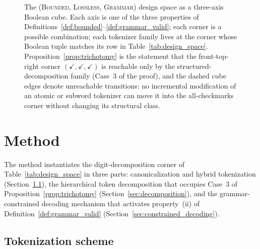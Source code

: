 \documentclass[sensors,article,submit,moreauthors,pdftex]{Definitions/mdpi}
\begin{document}
\begin{figure}[htbp]
\caption{The (\textsc{Bounded}, \textsc{Lossless}, \textsc{Grammar}) design space as a three-axis Boolean cube. Each axis is one of the three properties of Definitions~\ref{def:bounded}--\ref{def:grammar_valid}; each corner is a possible combination; each tokenizer family lives at the corner whose Boolean tuple matches its row in Table~\ref{tab:design_space}. Proposition~\ref{prop:trichotomy} is the statement that the front-top-right corner $(\checkmark,\checkmark,\checkmark)$ is reachable only by the structured-decomposition family (Case~3 of the proof), and the dashed cube edges denote unreachable transitions: no incremental modification of an atomic or subword tokenizer can move it into the all-checkmarks corner without changing its structural class.}
\label{fig:design_space_cube}
\end{figure}

\section{Method}
\label{sec:method}

The method instantiates the digit-decomposition corner of Table~\ref{tab:design_space} in three parts: canonicalization and hybrid tokenization (Section~\ref{sec:tokenization}), the hierarchical token decomposition that occupies Case~3 of Proposition~\ref{prop:trichotomy} (Section~\ref{sec:decomposition}), and the grammar-constrained decoding mechanism that activates property~(ii) of Definition~\ref{def:grammar_valid} (Section~\ref{sec:constrained_decoding}).

\subsection{Tokenization scheme}
\label{sec:tokenization}
\end{document}
